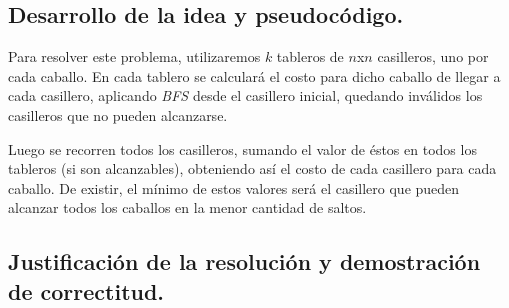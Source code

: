 \newpage
\subsection{Desarrollo de la idea y pseudocódigo.}

\vspace*{0.3cm}


Para resolver este problema, utilizaremos $k$ tableros de $n$x$n$ casilleros,
uno por cada caballo. En cada tablero se calculará el costo para dicho caballo
de llegar a cada casillero, aplicando \textit{BFS} desde el casillero inicial,
quedando inválidos los casilleros que no pueden alcanzarse.

Luego se recorren todos los casilleros, sumando el valor de éstos en todos los
tableros (si son alcanzables), obteniendo así el costo de cada casillero para
cada caballo. De existir, el mínimo de estos valores será el casillero que
pueden alcanzar todos los caballos en la menor cantidad de saltos.

%
%



\newpage
\subsection{Justificación de la resolución y demostración de correctitud.}

